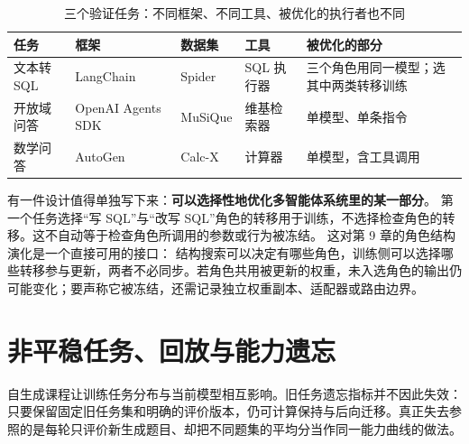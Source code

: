 \begin{table}[htbp]
\centering
\caption{三个验证任务：不同框架、不同工具、被优化的执行者也不同}
\label{tab:ch11-plumb}
\begin{small}
\begin{tabular}{>{\raggedright\arraybackslash}p{2.8cm}>{\raggedright\arraybackslash}p{2.8cm}>{\raggedright\arraybackslash}p{2.4cm}>{\raggedright\arraybackslash}p{2.2cm}>{\raggedright\arraybackslash}p{3.4cm}}
\toprule
任务 & 框架 & 数据集 & 工具 & 被优化的部分 \\
\midrule
文本转 SQL & LangChain & Spider & SQL 执行器 & 三个角色用同一模型；选其中两类转移训练 \\
\midrule
开放域问答 & OpenAI Agents SDK & MuSiQue & 维基检索器 & 单模型、单条指令 \\
\midrule
数学问答 & AutoGen & Calc-X & 计算器 & 单模型，含工具调用 \\
\bottomrule
\end{tabular}
\end{small}
\end{table}

\begin{sloppypar}
有一件设计值得单独写下来：\textbf{可以选择性地优化多智能体系统里的某一部分}。
第一个任务选择“写 SQL”与“改写 SQL”角色的转移用于训练，不选择检查角色的转移。这不自动等于检查角色所调用的参数或行为被冻结。
这对第 9 章的角色结构演化是一个直接可用的接口：
结构搜索可以决定有哪些角色，训练侧可以选择哪些转移参与更新，两者不必同步。若角色共用被更新的权重，未入选角色的输出仍可能变化；要声称它被冻结，还需记录独立权重副本、适配器或路由边界。
\end{sloppypar}

\section{非平稳任务、回放与能力遗忘}
\label{sec:ch11-nonstationary}

\begin{sloppypar}
自生成课程让训练任务分布与当前模型相互影响。旧任务遗忘指标并不因此失效：只要保留固定旧任务集和明确的评价版本，仍可计算保持与后向迁移。真正失去参照的是每轮只评价新生成题目、却把不同题集的平均分当作同一能力曲线的做法。
\end{sloppypar}

